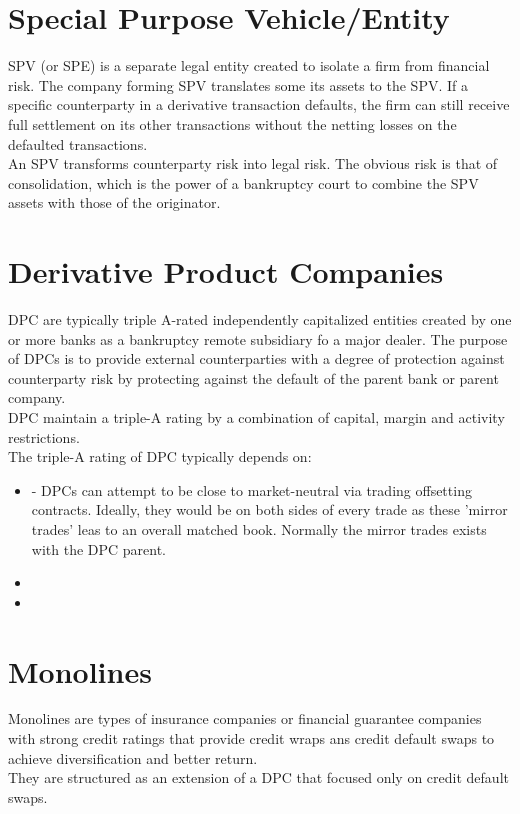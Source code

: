 \section{Special Purpose Vehicle/Entity}
SPV (or SPE) is a separate legal entity created to isolate a firm from financial risk. The company forming SPV translates some its assets to the SPV. If a specific counterparty in a derivative transaction defaults, the firm can still receive full settlement on its other transactions without the netting losses on the defaulted transactions.\\
An SPV transforms counterparty risk into legal risk. The obvious risk is that of consolidation, which is the power of a bankruptcy court to combine the SPV assets with those of the originator.

\section{Derivative Product Companies}
DPC are typically triple A-rated independently capitalized entities created by one or more banks as a bankruptcy remote subsidiary fo a major dealer. The purpose of DPCs is to provide external counterparties with a degree of protection against counterparty risk by protecting against the default of the parent bank or parent company.\\
DPC maintain a triple-A rating by a combination of capital, margin and activity restrictions.\\
The triple-A rating of DPC typically depends on:
\begin{itemize}
	\item {} - DPCs can attempt to be close to market-neutral via trading offsetting contracts. Ideally, they would be on both sides of every trade as these 'mirror trades' leas to an overall matched book. Normally the mirror trades exists with the DPC parent.
	\item {}
	\item {}
\end{itemize}

\section{Monolines}
Monolines are types of insurance companies or financial guarantee companies with strong credit ratings that provide credit wraps ans credit default swaps to achieve diversification and better return.\\
They are structured as an extension of a DPC that focused only on credit default swaps.
